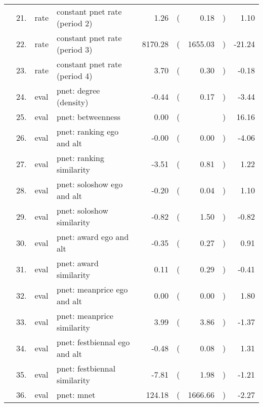 \begin{table}[ht]
\begin{tabular}{llllrlrlr}
    & 21. & rate & constant pnet rate (period 2) & 1.26 & ( & 0.18 & ) & 1.10 \\ 
    & 22. & rate & constant pnet rate (period 3) & 8170.28 & ( & 1655.03 & ) & -21.24 \\ 
    & 23. & rate & constant pnet rate (period 4) & 3.70 & ( & 0.30 & ) & -0.18 \\ 
    & 24. & eval & pnet: degree (density) & -0.44 & ( & 0.17 & ) & -3.44 \\ 
    & 25. & eval & pnet: betweenness & 0.00 & ( &  & ) & 16.16 \\ 
    & 26. & eval & pnet: ranking ego and alt & -0.00 & ( & 0.00 & ) & -4.06 \\ 
    & 27. & eval & pnet: ranking similarity & -3.51 & ( & 0.81 & ) & 1.22 \\ 
    & 28. & eval & pnet: soloshow ego and alt & -0.20 & ( & 0.04 & ) & 1.10 \\ 
    & 29. & eval & pnet: soloshow similarity & -0.82 & ( & 1.50 & ) & -0.82 \\ 
    & 30. & eval & pnet: award ego and alt & -0.35 & ( & 0.27 & ) & 0.91 \\ 
    & 31. & eval & pnet: award similarity & 0.11 & ( & 0.29 & ) & -0.41 \\ 
    & 32. & eval & pnet: meanprice ego and alt & 0.00 & ( & 0.00 & ) & 1.80 \\ 
    & 33. & eval & pnet: meanprice similarity & 3.99 & ( & 3.86 & ) & -1.37 \\ 
    & 34. & eval & pnet: festbiennal ego and alt & -0.48 & ( & 0.08 & ) & 1.31 \\ 
    & 35. & eval & pnet: festbiennal similarity & -7.81 & ( & 1.98 & ) & -1.21 \\ 
    & 36. & eval & pnet: mnet & 124.18 & ( & 1666.66 & ) & -2.27 \\ 
   \hline
\end{tabular}
\end{table}
